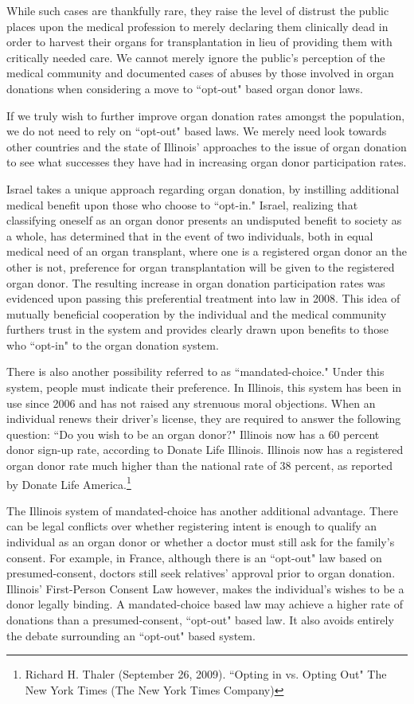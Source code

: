 \documentclass[letterpaper,10pt,twoside]{article}
\begin{document}
While such cases are thankfully rare, they raise the level of distrust the public places upon the medical profession to merely declaring them clinically dead in order to harvest their organs for transplantation  in lieu of providing them with critically needed care.  We cannot merely ignore the public's perception of the medical community and documented cases of abuses by those involved in organ donations when considering a move to ``opt-out" based organ donor laws.

If we truly wish to further improve organ donation rates amongst the population, we do not need to rely on ``opt-out" based laws.  We merely need look towards other countries and the state of Illinois' approaches to the issue of organ donation to see what successes they have had in increasing organ donor participation rates.

Israel takes a unique approach regarding organ donation, by instilling additional medical benefit upon those who choose to ``opt-in."  Israel, realizing that classifying oneself as an organ donor presents an undisputed benefit to society as a whole, has determined that in the event of two individuals, both in equal medical need of an organ transplant, where one is a registered organ donor an the other is not, preference for organ transplantation will be given to the registered organ donor.  The resulting increase in organ donation participation rates was evidenced upon passing this preferential treatment into law in 2008.  This idea of mutually beneficial cooperation by the individual and the medical community furthers trust in the system and provides clearly drawn upon benefits to those who ``opt-in" to the organ donation system.

There is also another possibility referred to as ``mandated-choice."  Under this system, people must indicate their preference.  In Illinois, this system has been in use since 2006 and has not raised any strenuous moral objections.  When an individual renews their driver's license, they are required to answer the following question: ``Do you wish to be an organ donor?"  Illinois now has a 60 percent donor sign-up rate, according to Donate Life Illinois.  Illinois now has a registered organ donor rate much higher than the national rate of 38 percent, as reported by Donate Life America.\footnote{Richard H. Thaler (September 26, 2009). ``Opting in vs. Opting Out" The New York Times (The New York Times Company)}

The Illinois system of mandated-choice has another additional advantage.  There can be legal conflicts over whether registering intent is enough to qualify an individual as an organ donor or whether a doctor must still ask for the family's consent. For example, in France, although there is an ``opt-out" law based on presumed-consent, doctors still seek relatives' approval prior to organ donation.  Illinois' First-Person Consent Law however, makes the individual's wishes to be a donor legally binding.  A mandated-choice based  law may achieve a higher rate of donations than a presumed-consent, ``opt-out" based law.  It also avoids entirely the debate surrounding an ``opt-out" based system.
\end{document}
